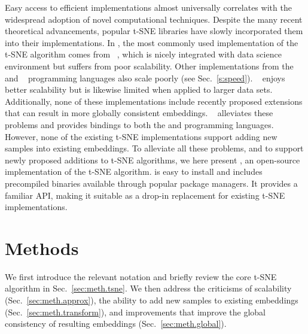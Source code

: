\documentclass[article]{jss}
\newcommand{\opentsne}{\pkg{openTSNE}\xspace}
\begin{document}
Easy access to efficient implementations almost universally correlates with the widespread adoption of novel computational techniques. Despite the many recent theoretical advancements, popular t-SNE libraries have slowly incorporated them into their implementations.
In , the most commonly used implementation of the t-SNE algorithm comes from ~\citep{pedregosa2011scikit}, which is nicely integrated with  data science environment but suffers from poor scalability. Other implementations from the ~\citep{team2013r,krijthe2015rtsne} and ~\citep{bezanson2017julia,julia_tsne} programming languages also scale poorly (see Sec.~\ref{s:speed}). ~\citep{Ulyanov2016} enjoys better scalability but is likewise limited when applied to larger data sets. Additionally, none of these implementations include recently proposed extensions that can result in more globally consistent embeddings. ~\citep{linderman2019fast} alleviates these problems and provides bindings to both the  and  programming languages. However, none of the existing t-SNE implementations support adding new samples into existing embeddings. To alleviate all these problems, and to support newly proposed additions to t-SNE algorithms, we here present \opentsne, an open-source  implementation of the t-SNE algorithm. \opentsne is easy to install and includes precompiled binaries available through popular  package managers. It provides a familiar API, making it suitable as a drop-in replacement for existing t-SNE implementations.




\section{Methods} \label{sec:methods}

We first introduce the relevant notation and briefly review the core t-SNE
algorithm in Sec.~\ref{sec:meth.tsne}. We then address the criticisms of
scalability (Sec.~\ref{sec:meth.approx}), the ability to add new samples to
existing embeddings (Sec.~\ref{sec:meth.transform}), and improvements that
improve the global consistency of resulting embeddings
(Sec.~\ref{sec:meth.global}).
\end{document}
